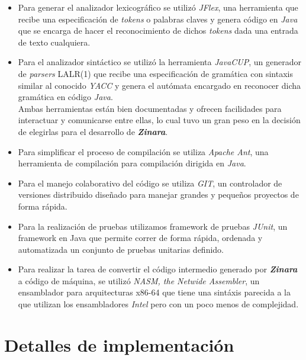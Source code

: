 \documentclass[12pt, spanish]{report}
\begin{document}
\begin{itemize}
\item Para generar el analizador lexicogr\'afico se utiliz\'o
  \emph{JFlex}\cite{jflex}, una herramienta que recibe una
  especificaci\'on de \emph{tokens} o palabras claves y genera c\'odigo en
  \emph{Java} que se encarga de hacer el reconocimiento de dichos
  \emph{tokens} dada una entrada de texto cualquiera.

\item Para el analizador sint\'actico se utiliz\'o la herramienta
  \emph{JavaCUP}\cite{javacup}, un generador de \emph{parsers} LALR(1)
  que recibe una especificaci\'on de gram\'atica con sintaxis similar
  al conocido \emph{YACC} y genera el aut\'omata encargado en
  reconocer dicha gram\'atica en c\'odigo \emph{Java}.\\

  Ambas herramientas est\'an bien documentadas y ofrecen facilidades
  para interactuar y comunicarse entre ellas, lo cual tuvo un gran
  peso en la decisi\'on de elegirlas para el desarrollo de
  \emph{\textbf{Zinara}}.

\item Para simplificar el proceso de compilaci\'on se utiliza
  \emph{Apache Ant}\cite{ant}, una herramienta de compilaci\'on para
  compilaci\'on dirigida en \emph{Java}.

\item Para el manejo colaborativo del c\'odigo se utiliza
  \emph{GIT}\cite{git}, un controlador de versiones distribuido
  dise\~nado para manejar grandes y peque\~nos proyectos de forma
  r\'apida.

\item Para la realizaci\'on de pruebas utilizamos framework de pruebas
  \emph{JUnit}, un framework en Java que permite correr de forma
  r\'apida, ordenada y automatizada un conjunto de pruebas unitarias
  definido.

\item Para realizar la tarea de convertir el código intermedio
  generado por \emph{\textbf{Zinara}} a código de máquina, se utilizó
  \emph{NASM, the Netwide Assembler}, un ensamblador para
  arquitecturas x86-64 que tiene una sintáxis parecida a la que
  utilizan los ensambladores \emph{Intel} pero con un poco menos de
  complejidad.
\end{itemize}

\chapter{Detalles de implementaci\'on}
\label{sec:codigo}
\end{document}
